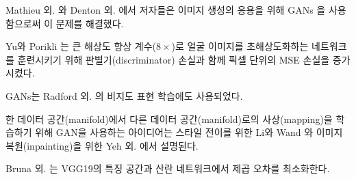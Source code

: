 \documentclass[10pt,twocolumn,letterpaper]{article}
\newcommand{\kor}[1]{#1}
\newcommand{\eng}[1]{}
\begin{document}
\eng{
In Mathieu et al. \cite{Mathieu2015} and Denton et al. \cite{Denton2015} the authors tackled this problem by employing \acp{GAN} \cite{Goodfellow14GAN} for the application of image generation.
}\kor{
Mathieu 외. \cite{Mathieu2015}와 Denton 외. \cite{Denton2015}에서 저자들은 이미지 생성의 응용을 위해 \acp{GAN} \cite{Goodfellow14GAN}을 사용함으로써 이 문제를 해결했다.
} \eng{
Yu and Porikli \cite{yu2016ultra} augment pixel-wise \ac{MSE} loss with a discriminator loss to train a network that super-resolves face images with large upscaling factors ($8\times$).
}\kor{
Yu와 Porikli \cite{yu2016ultra}는 큰 해상도 향상 계수($8\times$)로 얼굴 이미지를 초해상도화하는 네트워크를 훈련시키기 위해 판별기(discriminator) 손실과 함께 픽셀 단위의 \ac{MSE} 손실을 증가시켰다.
} \eng{
\acp{GAN} were also used for unsupervised representation learning in Radford et al. \cite{Radford2015}.
}\kor{
\acp{GAN}는 Radford 외. \cite{Radford2015}의 비지도 표현 학습에도 사용되었다.
}
\eng{
The idea of using \acp{GAN} to learn a mapping from one manifold to another is described by Li and Wand \cite{Li2016} for style transfer and Yeh et al. \cite{Yeh2016} for inpainting.
}\kor{
한 데이터 공간(manifold)에서 다른 데이터 공간(manifold)로의 사상(mapping)을 학습하기 위해 GAN을 사용하는 아이디어는 스타일 전이를 위한 Li와 Wand \cite{Li2016}와 이미지 복원(inpainting)을 위한 Yeh 외. \cite{Yeh2016}에서 설명된다.
}
\eng{
Bruna et al. \cite{bruna2016super} minimize the squared error in the feature spaces of VGG19 \cite{simonyan2014very} and scattering networks.
}\kor{
Bruna 외. \cite{bruna2016super}는 VGG19의 특징 공간과 산란 네트워크에서 제곱 오차를 최소화한다.
}
\end{document}
